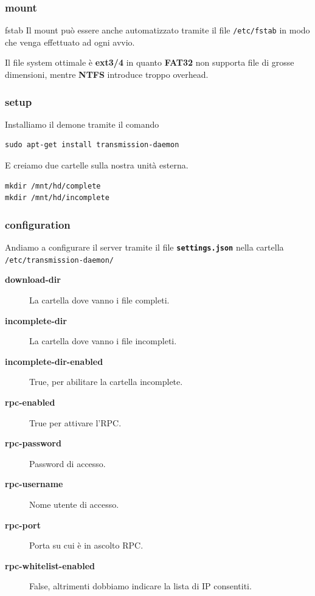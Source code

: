 \documentclass[xcolor=svgnames,11pt]{beamer}
\begin{document}
\begin{frame}\frametitle{mount}
\begin{block}{fstab}
Il mount pu\`o essere anche automatizzato tramite il file \texttt{/etc/fstab} in modo che venga effettuato ad ogni avvio.  
\end{block}

Il file system ottimale \`e \textbf{ext3/4} in quanto \textbf{FAT32} non supporta file di grosse dimensioni, mentre \textbf{NTFS} introduce troppo overhead.
\end{frame}

\begin{frame}[fragile]\frametitle{setup}
Installiamo il demone tramite il comando
\begin{block}{}
\begin{verbatim}
sudo apt-get install transmission-daemon
\end{verbatim}
\end{block}
\medskip
E creiamo due cartelle sulla nostra unit\`a esterna.
\begin{block}{}
\begin{verbatim}
mkdir /mnt/hd/complete
mkdir /mnt/hd/incomplete
\end{verbatim}
\end{block}
\end{frame}

\begin{frame}[fragile]\frametitle{configuration}
Andiamo a configurare il server tramite il file \textbf{\texttt{settings.json}} nella cartella \texttt{/etc/transmission-daemon/}
\medskip
\begin{footnotesize}
\begin{description}
  \item[\textbf{download-dir}] La cartella dove vanno i file completi.
  \item[\textbf{incomplete-dir}] La cartella dove vanno i file incompleti.
  \item[\textbf{incomplete-dir-enabled}] True, per abilitare la cartella incomplete.
  \item[\textbf{rpc-enabled}] True per attivare l'RPC.
  \item[\textbf{rpc-password}] Password di accesso.
  \item[\textbf{rpc-username}] Nome utente di accesso.
  \item[\textbf{rpc-port}] Porta su cui \`e in ascolto RPC.
  \item[\textbf{rpc-whitelist-enabled}] False, altrimenti dobbiamo indicare la lista di IP consentiti.
\end{description}
\end{footnotesize}
\end{frame}
\end{document}
